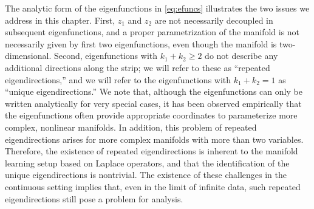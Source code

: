 %
The analytic form of the eigenfunctions in \eqref{eq:efuncs} illustrates the two issues we address in this chapter.
%
First, $z_1$ and $z_2$ are not necessarily decoupled in subsequent eigenfunctions, and a proper parametrization of the manifold is not necessarily given by first two eigenfunctions, even though the manifold is two-dimensional.
%
Second, eigenfunctions with $k_1+k_2 \ge 2$ do not describe any additional directions along the strip; we will refer to these as ``repeated eigendirections,'' and we will refer to the eigenfunctions with $k_1+k_2 =1$ as ``unique eigendirections.''
%
We note that, although the eigenfunctions can only be written analytically for very special cases, it has been observed empirically that the eigenfunctions often provide appropriate coordinates to parameterize more complex, nonlinear manifolds.
%
In addition, this problem of repeated eigendirections arises for more complex manifolds with more than two variables.
%
Therefore, the existence of repeated eigendirections is inherent to the manifold learning setup based on Laplace operators, and that the identification of the unique eigendirections is nontrivial.
%
The existence of these challenges in the continuous setting implies that, even in the limit of infinite data, such repeated eigendirections still pose a problem for analysis.


